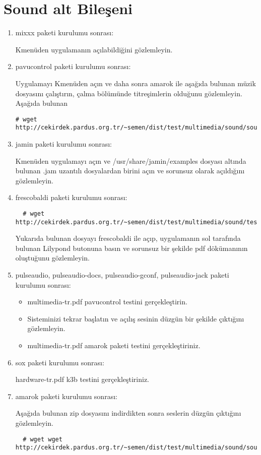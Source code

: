 \documentclass[a4paper,10pt]{article}
\begin{document}
\section{Sound alt Bileşeni}
\begin{enumerate}
\item mixxx paketi kurulumu sonrası:

Kmenüden uygulamanın açılabildiğini gözlemleyin.
\item pavucontrol paketi kurulumu sonrası:

Uygulamayı Kmenüden açın ve daha sonra amarok ile aşağıda bulunan müzik dosyasını çalıştırın, çalma bölümünde titreşimlerin olduğunu gözlemleyin.
Aşağıda bulunan
\begin{verbatim}
# wget http://cekirdek.pardus.org.tr/~semen/dist/test/multimedia/sound/sound/sample.mp3
\end{verbatim}

\item jamin paketi kurulumu sonrası:

Kmenüden uygulamayı açın ve /usr/share/jamin/examples dosyası altında bulunan .jam uzantılı dosyalardan birini açın ve sorunsuz olarak açıldığını gözlemleyin.
\item frescobaldi paketi kurulumu sonrası:
 \begin{verbatim}
  # wget http://cekirdek.pardus.org.tr/~semen/dist/test/multimedia/sound/test_frescobaldi.ly
 \end{verbatim}
Yukarıda bulunan dosyayı frescobaldi ile açıp, uygulamanın sol tarafında bulunan Lilypond butonuna basın ve sorunsuz bir şekilde pdf dökümanının oluştuğunu gözlemleyin.
\item pulseaudio, pulseaudio-docs, pulseaudio-gconf, pulseaudio-jack paketi kurulumu sonrası:
\begin{itemize}
 \item multimedia-tr.pdf pavucontrol testini gerçekleştirin.
 \item Sisteminizi tekrar başlatın ve açılış sesinin düzgün bir şekilde çıktığını gözlemleyin. 
 \item multimedia-tr.pdf amarok paketi testini gerçekleştiriniz.
\end{itemize}
\item sox paketi kurulumu sonrası:

hardware-tr.pdf k3b testini gerçekleştiriniz.
\item amarok paketi kurulumu sonrası:
 
Aşağıda bulunan zip dosyasını indirdikten sonra seslerin düzgün çıktığını gözlemleyin.
 \begin{verbatim}
  # wget wget http://cekirdek.pardus.org.tr/~semen/dist/test/multimedia/sound/sound.tar
 \end{verbatim}	


\end{enumerate}
\end{document}
